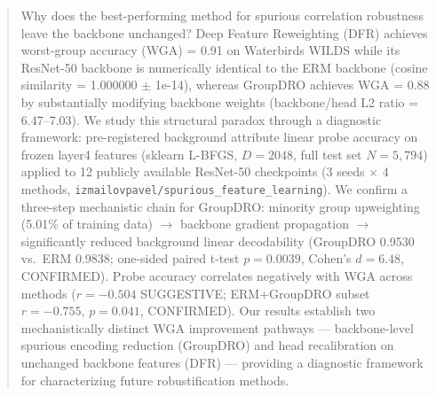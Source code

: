 \begin{abstract}
Why does the best-performing method for spurious correlation robustness leave the backbone unchanged? Deep Feature Reweighting (DFR) achieves worst-group accuracy (WGA) = 0.91 on Waterbirds WILDS while its ResNet-50 backbone is numerically identical to the ERM backbone (cosine similarity = 1.000000 $\pm$ 1e-14), whereas GroupDRO achieves WGA = 0.88 by substantially modifying backbone weights (backbone/head L2 ratio = 6.47--7.03). We study this structural paradox through a diagnostic framework: pre-registered background attribute linear probe accuracy on frozen layer4 features (sklearn L-BFGS, $D = 2048$, full test set $N = 5{,}794$) applied to 12 publicly available ResNet-50 checkpoints (3 seeds $\times$ 4 methods, \texttt{izmailovpavel/spurious\_feature\_learning}). We confirm a three-step mechanistic chain for GroupDRO: minority group upweighting (5.01\% of training data) $\to$ backbone gradient propagation $\to$ significantly reduced background linear decodability (GroupDRO 0.9530 vs.\ ERM 0.9838; one-sided paired t-test $p = 0.0039$, Cohen's $d = 6.48$, CONFIRMED). Probe accuracy correlates negatively with WGA across methods ($r = -0.504$ SUGGESTIVE; ERM+GroupDRO subset $r = -0.755$, $p = 0.041$, CONFIRMED). Our results establish two mechanistically distinct WGA improvement pathways --- backbone-level spurious encoding reduction (GroupDRO) and head recalibration on unchanged backbone features (DFR) --- providing a diagnostic framework for characterizing future robustification methods.
\end{abstract}
